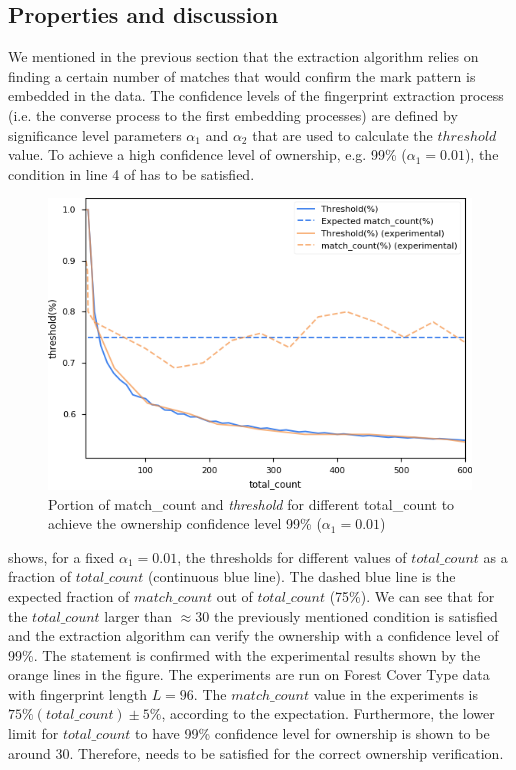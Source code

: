\subsection{Properties and discussion}
We mentioned in the previous section that the extraction algorithm relies on finding a certain number of matches that would confirm the mark pattern is embedded in the data.
The confidence levels of the fingerprint extraction process (i.e. the converse process to the first embedding processes) are defined by significance level parameters $\alpha_1$ and $\alpha_2$ that are used to calculate the $threshold$ value. 
To achieve a high confidence level of ownership, e.g. 99\% ($\alpha_1 = 0.01$), the condition in line 4 of  has to be satisfied.

\begin{figure}
    \centering
    \includegraphics[width=\textwidth]{Figures/threshold_two-level.png}
    \caption{Portion of match\_count and \textit{threshold} for different total\_count to achieve the ownership confidence level 99\% ($\alpha_1=0.01$)}
    \label{fig:threshold-ownership}
\end{figure}

 shows, for a fixed $\alpha_1=0.01$, the thresholds for different values of $total\_count$ as a fraction of $total\_count$ (continuous blue line).
The dashed blue line is the expected fraction of $match\_count$ out of $total\_count$ (75\%).
We can see that for the $total\_count$ larger than $\approx 30$ the previously mentioned condition is satisfied and the extraction algorithm can verify the ownership with a confidence level of 99\%. 
The statement is confirmed with the experimental results shown by the orange lines in the figure.
The experiments are run on Forest Cover Type data with fingerprint length $L=96$.
The $match\_count$ value in the experiments is $75\%(total\_count)\pm5\%$, according to the expectation. Furthermore, the lower limit for $total\_count$ to have 99\% confidence level for ownership is shown to be around 30. 
Therefore,  needs to be satisfied for the correct ownership verification.

